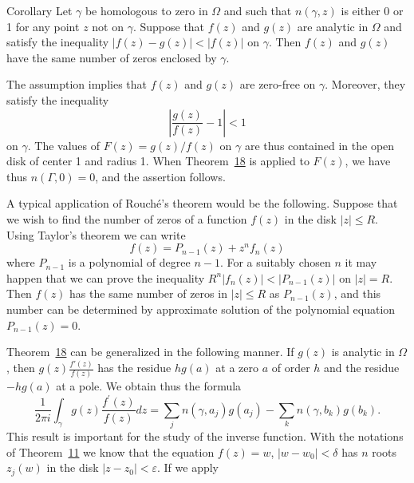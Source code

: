 \begin{originalstatement}{Corollary}{}\label{cor:4.unnumbered-p169-b2}
Let $\gamma$ be homologous to zero in $\Omega$ and such that $n(\gamma, z)$ is either 0 or 1 for any point $z$ not on $\gamma$. Suppose that $f(z)$ and $g(z)$ are analytic in $\Omega$ and satisfy the inequality $|f(z) - g(z)| < |f(z)|$ on $\gamma$. Then $f(z)$ and $g(z)$ have the same number of zeros enclosed by $\gamma$.
\end{originalstatement}
The assumption implies that $f(z)$ and $g(z)$ are zero-free on $\gamma$. Moreover, they satisfy the inequality
\begin{equation*}
\left| \frac {g (z)}{f (z)} - 1 \right| <   1
\end{equation*}
on $\gamma$. The values of $F(z) = g(z)/f(z)$ on $\gamma$ are thus contained in the open disk of center 1 and radius 1. When Theorem~\hyperref[thm:4.18]{18} is applied to $F(z)$, we have thus $n(\Gamma,0) = 0$, and the assertion follows.

A typical application of Rouché's theorem would be the following. Suppose that we wish to find the number of zeros of a function $f(z)$ in the disk $|z| \leq R$. Using Taylor's theorem we can write
\begin{equation*}
f (z) = P _ {n - 1} (z) + z ^ {n} f _ {n} (z)
\end{equation*}
where $P_{n-1}$ is a polynomial of degree $n - 1$. For a suitably chosen $n$ it may happen that we can prove the inequality $R^n |f_n(z)| < |P_{n-1}(z)|$ on $|z| = R$. Then $f(z)$ has the same number of zeros in $|z| \leq R$ as $P_{n-1}(z)$, and this number can be determined by approximate solution of the polynomial equation $P_{n-1}(z) = 0$.

Theorem~\hyperref[thm:4.18]{18} can be generalized in the following manner. If $g(z)$ is analytic in $\Omega$, then $g(z)\frac{f'(z)}{f(z)}$ has the residue $hg(a)$ at a zero $a$ of order $h$ and the residue $-hg(a)$ at a pole. We obtain thus the formula
\begin{equation*}
\frac {1}{2 \pi i} \int_ {\gamma} g (z) \frac {f ^ {\prime} (z)}{f (z)} d z = \sum_ {j} n (\gamma , a _ {j}) g (a _ {j}) - \sum_ {k} n (\gamma , b _ {k}) g (b _ {k}).\tag{49}\label{eq:4.49}
\end{equation*}
This result is important for the study of the inverse function. With the notations of Theorem~\hyperref[thm:4.11]{11} we know that the equation $f(z) = w$, $|w - w_0| < \delta$ has $n$ roots $z_j(w)$ in the disk $|z - z_0| < \varepsilon$. If we apply


